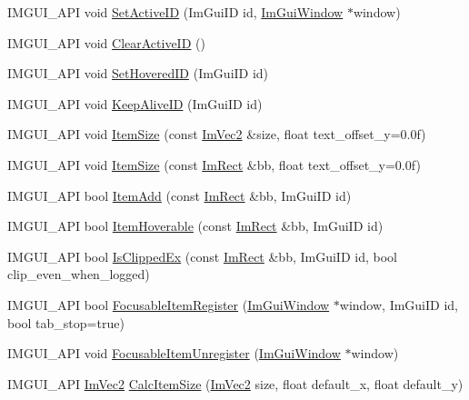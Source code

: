 \begin{DoxyCompactItemize}
\item 
I\+M\+G\+U\+I\+\_\+\+A\+PI void \hyperlink{namespace_im_gui_a27b8ace13a8c421ee8405f0cbebe4ead}{Set\+Active\+ID} (Im\+Gui\+ID id, \hyperlink{struct_im_gui_window}{Im\+Gui\+Window} $\ast$window)
\item 
I\+M\+G\+U\+I\+\_\+\+A\+PI void \hyperlink{namespace_im_gui_a17ff60ad1e2669130ac38a04d16eb354}{Clear\+Active\+ID} ()
\item 
I\+M\+G\+U\+I\+\_\+\+A\+PI void \hyperlink{namespace_im_gui_aba1f0c75d6f98702e6b02eb1bc30d915}{Set\+Hovered\+ID} (Im\+Gui\+ID id)
\item 
I\+M\+G\+U\+I\+\_\+\+A\+PI void \hyperlink{namespace_im_gui_a85a245c78a9f7c351636bdad6e60c488}{Keep\+Alive\+ID} (Im\+Gui\+ID id)
\item 
I\+M\+G\+U\+I\+\_\+\+A\+PI void \hyperlink{namespace_im_gui_ac7b9a7399d9606b25278002303f545b6}{Item\+Size} (const \hyperlink{struct_im_vec2}{Im\+Vec2} \&size, float text\+\_\+offset\+\_\+y=0.\+0f)
\item 
I\+M\+G\+U\+I\+\_\+\+A\+PI void \hyperlink{namespace_im_gui_a97b821f022e36964b40973fe1ff4367b}{Item\+Size} (const \hyperlink{struct_im_rect}{Im\+Rect} \&bb, float text\+\_\+offset\+\_\+y=0.\+0f)
\item 
I\+M\+G\+U\+I\+\_\+\+A\+PI bool \hyperlink{namespace_im_gui_a454e81b7c3befcc51c900f2fb3bd5a9a}{Item\+Add} (const \hyperlink{struct_im_rect}{Im\+Rect} \&bb, Im\+Gui\+ID id)
\item 
I\+M\+G\+U\+I\+\_\+\+A\+PI bool \hyperlink{namespace_im_gui_a488b86a9f235923304186fb86ff64ffb}{Item\+Hoverable} (const \hyperlink{struct_im_rect}{Im\+Rect} \&bb, Im\+Gui\+ID id)
\item 
I\+M\+G\+U\+I\+\_\+\+A\+PI bool \hyperlink{namespace_im_gui_a8674467ae34d04bc99df1f7f98f47407}{Is\+Clipped\+Ex} (const \hyperlink{struct_im_rect}{Im\+Rect} \&bb, Im\+Gui\+ID id, bool clip\+\_\+even\+\_\+when\+\_\+logged)
\item 
I\+M\+G\+U\+I\+\_\+\+A\+PI bool \hyperlink{namespace_im_gui_ab1e2f7069edbab669b56e93e30930c45}{Focusable\+Item\+Register} (\hyperlink{struct_im_gui_window}{Im\+Gui\+Window} $\ast$window, Im\+Gui\+ID id, bool tab\+\_\+stop=true)
\item 
I\+M\+G\+U\+I\+\_\+\+A\+PI void \hyperlink{namespace_im_gui_a390518fcaef04b4d399d2475d4d84df7}{Focusable\+Item\+Unregister} (\hyperlink{struct_im_gui_window}{Im\+Gui\+Window} $\ast$window)
\item 
I\+M\+G\+U\+I\+\_\+\+A\+PI \hyperlink{struct_im_vec2}{Im\+Vec2} \hyperlink{namespace_im_gui_a3c1505e785f9571ed82500692a727c5f}{Calc\+Item\+Size} (\hyperlink{struct_im_vec2}{Im\+Vec2} size, float default\+\_\+x, float default\+\_\+y)

\end{DoxyCompactItemize}
